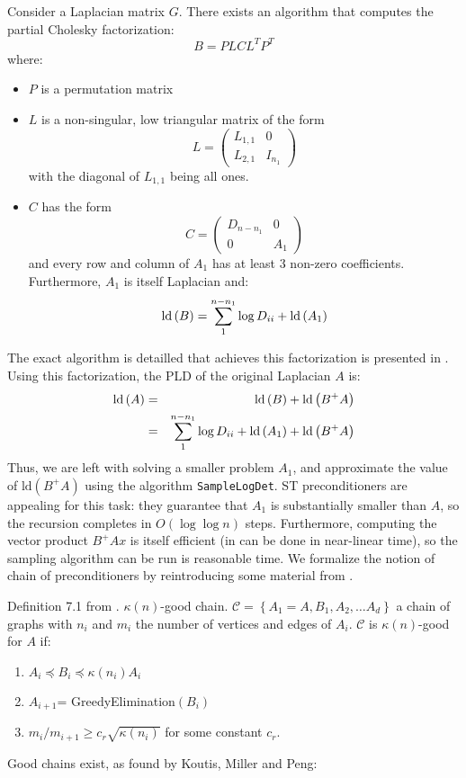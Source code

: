 Consider a Laplacian matrix $G$. There exists an algorithm that computes
the partial Cholesky factorization: 
\[
B=PLCL^{T}P^{T}
\]
where: 
\begin{itemize}
\item $P$ is a permutation matrix 
\item $L$ is a non-singular, low triangular matrix of the form 
\[
L=\left(\begin{array}{cc}
L_{1,1} & 0\\
L_{2,1} & I_{n_{1}}
\end{array}\right)
\]
with the diagonal of $L_{1,1}$ being all ones. 
\item $C$ has the form 
\[
C=\left(\begin{array}{cc}
D_{n-n_{1}} & 0\\
0 & A_{1}
\end{array}\right)
\]
and every row and column of $A_{1}$ has at least 3 non-zero coefficients.
Furthermore, $A_{1}$ is itself Laplacian and: 
\[
\text{ld}\left(B\right)=\sum_{1}^{n-n_{1}}\log D_{ii}+\mbox{\text{ld}}\left(A_{1}\right)
\]

\end{itemize}
The exact algorithm is detailled that achieves this factorization
is presented in \cite{Koutis2010}. Using this factorization, the
PLD of the original Laplacian $A$ is: 
\begin{eqnarray*}
\text{ld}\left(A\right) & = & \text{ld}\left(B\right)+\text{ld}\left(B^{+}A\right)\\
 & = & \sum_{1}^{n-n_{1}}\log D_{ii}+\mbox{\text{ld}}\left(A_{1}\right)+\text{ld}\left(B^{+}A\right)
\end{eqnarray*}
Thus, we are left with solving a smaller problem $A_{1}$, and approximate
the value of $\text{ld}\left(B^{+}A\right)$ using the algorithm \texttt{SampleLogDet}.
ST preconditioners are appealing for this task: they guarantee that
$A_{1}$ is substantially smaller than $A$, so the recursion completes
in $O\left(\log\log n\right)$ steps. Furthermore, computing the vector
product $B^{+}Ax$ is itself efficient (in can be done in near-linear
time), so the sampling algorithm can be run is reasonable time. We
formalize the notion of chain of preconditioners by reintroducing
some material from \cite{Koutis2010}. \begin{definition} Definition
7.1 from \cite{Koutis2010}. $\kappa\left(n\right)$-good chain. $\mathcal{C}=\left\{ A_{1}=A,B_{1},A_{2},\dots A_{d}\right\} $
a chain of graphs with $n_{i}$ and $m_{i}$ the number of vertices
and edges of $A_{i}$. $\mathcal{C}$ is $\kappa\left(n\right)$-good
for $A$ if:\end{definition} 
\begin{enumerate}
\item $A_{i}\preceq B_{i}\preceq\kappa\left(n_{i}\right)A_{i}$ 
\item $A_{i+1}$= GreedyElimination$\left(B_{i}\right)$ 
\item $m_{i}/m_{i+1}\geq c_{r}\sqrt{\kappa\left(n_{i}\right)}$ for some
constant $c_{r}$. 
\end{enumerate}
Good chains exist, as found by Koutis, Miller and Peng:

